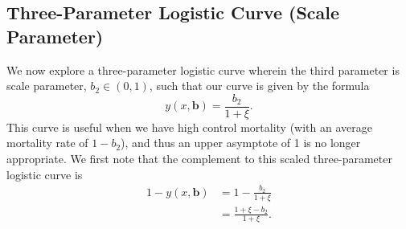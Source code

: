 \documentclass[11pt, letterpaper]{article}
\begin{document}
\subsection{Three-Parameter Logistic Curve (Scale Parameter)}
We now explore a three-parameter logistic curve wherein the third parameter is scale parameter, $b_2 \in (0,1)$, such that our curve is given by the formula
$$ y(x, \bm b) = \frac{b_2}{1+\xi} .$$ 
This curve is useful when we have high control mortality (with an average mortality rate of $1-b_2$), and thus an upper asymptote of 1 is no longer appropriate. We first note that the complement to this scaled three-parameter logistic curve is 
\begin{align*}
1 - y(x, \bm b) & = 1- \frac{b_2}{1+\xi} \\
& = \frac{1+\xi - b_2}{1+\xi}.
\end{align*}
\end{document}
